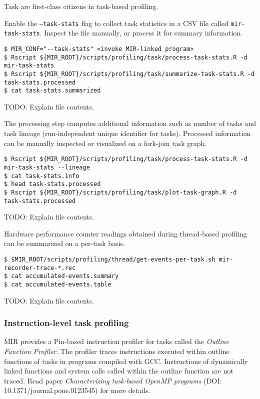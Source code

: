 \documentclass[11pt,a4paper]{article}
\begin{document}
Task are first-class citizens in task-based profiling.

Enable the \texttt{--task-stats} flag to collect task statistics in a CSV file called \texttt{mir-task-stats}. Inspect the file manually, or process it for summary information.

\begin{lstlisting}[style=MyInputStyle]
$ MIR_CONF="--task-stats" <invoke MIR-linked program>
$ Rscript ${MIR_ROOT}/scripts/profiling/task/process-task-stats.R -d mir-task-stats
$ Rscript ${MIR_ROOT}/scripts/profiling/task/summarize-task-stats.R -d task-stats.processed
$ cat task-stats.summarized
\end{lstlisting}

TODO: Explain file contents.

The processing step computes additional information such as number of tasks and task lineage (run-independent unique identifier for tasks). Processed information can be manually inspected or visualized on a fork-join task graph.

\begin{lstlisting}[style=MyInputStyle]
$ Rscript ${MIR_ROOT}/scripts/profiling/task/process-task-stats.R -d mir-task-stats --lineage
$ cat task-stats.info
$ head task-stats.processed
$ Rscript ${MIR_ROOT}/scripts/profiling/task/plot-task-graph.R -d task-stats.processed
\end{lstlisting}

TODO: Explain file contents.

Hardware performance counter readings obtained during thread-based profiling can be summarized on a per-task basis. 

\begin{lstlisting}[style=MyInputStyle]
$ $MIR_ROOT/scripts/profiling/thread/get-events-per-task.sh mir-recorder-trace-*.rec
$ cat accumulated-events.summary
$ cat accumulated-events.table
\end{lstlisting}

TODO: Explain file contents.

\subsubsection{Instruction-level task profiling}\label{instruction-level-task-profiling}

MIR provides a Pin-based instruction profiler for tasks called the \textit{Outline Function Profiler}.
The profiler traces instructions executed within outline functions of tasks in programs compiled with GCC. Instructions of dynamically linked functions and system calls called within the outline function are not traced. Read paper \textit{Characterizing task-based OpenMP programs} (DOI: 10.1371/journal.pone.0123545) for more details.
\end{document}
